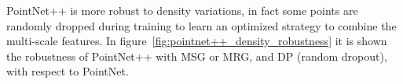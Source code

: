 PointNet++ is more robust to density variations, in fact some points are randomly dropped during training to learn an optimized strategy to combine the multi-scale features. In figure~\ref{fig:pointnet++_density_robustness} it is shown the robustness of PointNet++ with MSG or MRG, and DP (random dropout), with respect to PointNet.